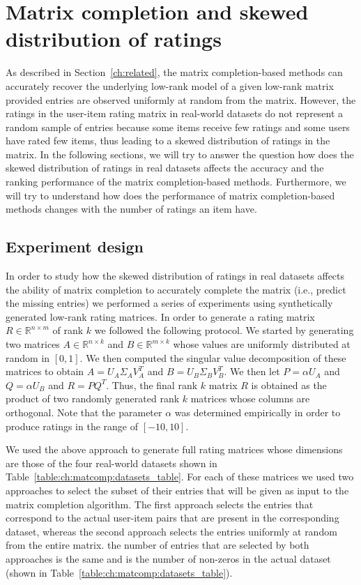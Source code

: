 
\section{Matrix completion and skewed distribution of ratings} \label{ch:matcomp:hypoexp}
As described in Section~\ref{ch:related}, the matrix completion-based methods
can accurately recover the underlying low-rank model of a given low-rank matrix
provided entries are observed uniformly at random from the matrix.
However, the ratings in the user-item rating matrix in real-world datasets
do not represent a random sample of entries because some items receive few
ratings and some users have rated few items, thus leading to a skewed distribution of 
ratings in the matrix.
In the following sections, we will try to answer the question how does the skewed 
distribution of ratings in real datasets affects the accuracy and the ranking
performance of the matrix completion-based methods. 
Furthermore, we will try to understand how does the performance of matrix
completion-based methods changes with the number of ratings an item have.

\subsection{Experiment design} \label{sec:ch:matcomp:expdesign}
In order to study how the skewed distribution of ratings in real datasets
affects the ability of matrix completion to accurately complete the matrix (i.e.,
predict the missing entries) we performed a series of experiments using synthetically
generated low-rank rating matrices. 
%
In order to generate a rating matrix $R\in \mathbb{R}^{n\times m}$ of rank $k$ we
followed the following protocol. We started by generating two matrices
$A\in\mathbb{R}^{n\times k}$ and $B\in\mathbb{R}^{m\times k}$ whose values are
uniformly distributed at random in $[0, 1]$. We then computed the singular value
decomposition of these matrices to obtain $A=U_A\Sigma_A V_A^T$ and $B=U_B\Sigma_B
V_B^T$. We then let $P=\alpha U_A$ and $Q=\alpha U_B$ and $R = PQ^T$. Thus, the final
rank $k$ matrix $R$ is obtained as the product of two randomly generated rank $k$
matrices whose columns are orthogonal. Note that the parameter $\alpha$ was
determined empirically in order to produce ratings in the range of $[-10, 10]$.

We used the above approach to generate full rating matrices whose dimensions are
those of the four real-world datasets shown in Table~\ref{table:ch:matcomp:datasets_table}. For
each of these matrices we used two approaches to select the subset of their entries
that will be given as input to the matrix completion algorithm. The first approach
selects the entries that correspond to the actual user-item pairs that are present in
the corresponding dataset, whereas the second approach selects the entries uniformly
at random from the entire matrix. the number of entries that are selected by both
approaches is the same and is the number of non-zeros in the actual dataset (shown in
Table~\ref{table:ch:matcomp:datasets_table}). 

